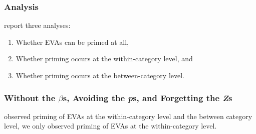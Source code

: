 \documentclass[noamssymb]{beamer}
\begin{document}
\begin{frame}

  \frametitle{{\ftf Analysis}}

  \citeauthor{Bott:2016aa} report three analyses:

  \begin{enumerate}[label=\arabic*.]
  \item Whether EVAs can be primed at all,
  \item Whether priming occurs at the within-category level, and
  \item Whether priming occurs at the between-category level.
  \end{enumerate}

\end{frame}

\begin{frame}
  \frametitle{{\ftf Without the \(\beta\)s, Avoiding the \emph{p}s, and Forgetting the \emph{Z}s}}

  \citeauthor{Bott:2016aa} observed priming of EVAs at the within-category level and the between category level, we only observed priming of EVAs at the within-category level.
\end{frame}
\end{document}

